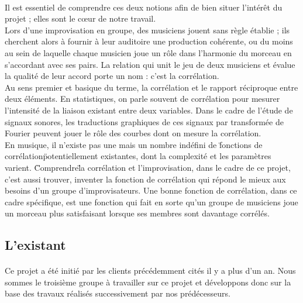 \documentclass{article}
\begin{document}
\paragraph{}
Il est essentiel de comprendre ces deux notions afin de bien situer l'intérêt du projet ; elles sont le c\oe ur de notre travail. \\
Lors d'une improvisation en groupe, des musiciens jouent sans règle établie ; ils cherchent alors à fournir à leur auditoire une production cohérente, ou du moins au sein de laquelle chaque musicien joue un rôle dans l'harmonie du morceau en s'accordant avec ses pairs. La relation qui unit le jeu de deux musiciens et évalue la qualité de leur accord porte un nom : c'est la corrélation. \\
Au sens premier et basique du terme, la corrélation et le rapport réciproque entre deux éléments. En statistiques, on parle souvent de corrélation pour mesurer l'intensité de la liaison existant entre deux variables. Dans le cadre de l'étude de signaux sonores, les traductions graphiques de ces signaux par transformée de Fourier peuvent jouer le rôle des courbes dont on mesure la corrélation. \\
En musique, il n'existe pas une mais un nombre indéfini de \"fonctions de corrélation\" potentiellement existantes, dont la complexité et les paramètres varient. \" Comprendre\" la corrélation et l'improvisation, dans le cadre de ce projet, c'est aussi trouver, inventer la fonction de corrélation qui répond le mieux aux besoins d'un groupe d'improvisateurs. Une bonne fonction de corrélation, dans ce cadre spécifique, est une fonction qui fait en sorte qu'un groupe de musiciens joue un morceau plus satisfaisant lorsque ses membres sont davantage corrélés. \\

\subsection{L'existant}
\paragraph{}
Ce projet a été initié par les clients précédemment cités il y a plus d'un an. Nous sommes le troisième groupe à travailler sur ce projet et développons donc sur la base des travaux réalisés successivement par nos prédécesseurs.
\end{document}

